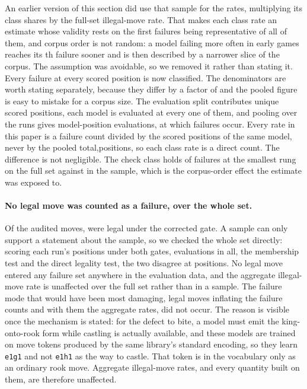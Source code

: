 \documentclass[11pt]{article}
\begin{document}
An earlier version of this section did use that sample for the rates, multiplying its
class shares by the full-set illegal-move rate. That makes each class rate an estimate
whose validity rests on the first  failures being representative of all of them,
and corpus order is not random: a model failing more often in early games reaches its
th failure sooner and is then described by a narrower slice of the corpus. The
assumption was avoidable, so we removed it rather than stating it. Every failure at
every scored position is now classified. The denominators are worth stating
separately, because they differ by a factor of  and the pooled figure is easy
to mistake for a corpus size. The evaluation split contributes  unique
scored positions, each model is evaluated at every one of them, and pooling over the
 runs gives  model-position evaluations, at which 
failures occur. Every rate in this paper is a failure count divided by the scored
positions of the same model, never by the pooled total,positions, so each class rate is a direct count. The difference is not negligible.
The check class holds  of failures at the smallest rung on the full set
against  in the sample, which is the corpus-order effect the estimate was
exposed to.

\paragraph{No legal move was counted as a failure, over the whole set.}
Of the  audited moves,  were legal under the corrected gate. A sample
can only support a statement about the sample, so we checked the whole set directly:
scoring each run's  positions under both gates,  evaluations in
all, the
membership test and the direct legality test, the two disagree at  positions.
No legal move entered any failure set anywhere in the evaluation data, and the
aggregate illegal-move rate is unaffected over the full set rather than in a sample. The failure mode that would have been most damaging, legal moves
inflating the failure counts and with them the aggregate rates, did not occur. The
reason is visible once the mechanism is stated: for the defect to bite, a model must
emit the king-onto-rook form while castling is actually available, and these models
are trained on move tokens produced by the same library's standard encoding, so they
learn \texttt{e1g1} and not \texttt{e1h1} as the way to castle. That token is in the
vocabulary only as an ordinary rook move. Aggregate illegal-move rates, and every
quantity built on them, are therefore unaffected.
\end{document}
